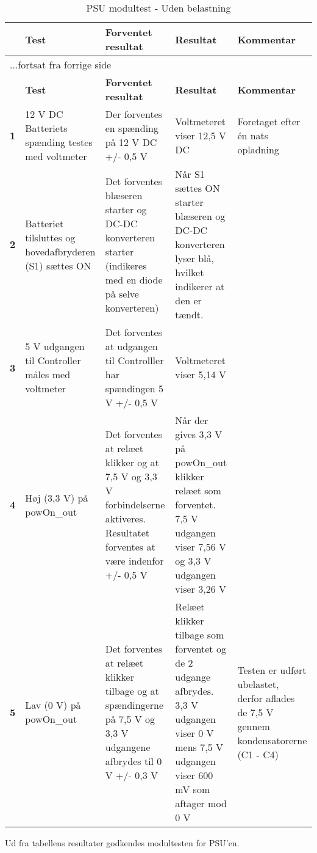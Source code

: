 \begin{center}
\label{modultest_psu} 
\begin{longtable}{|p{}|p{3cm}|p{3cm}|p{3cm}|p{3cm}|} %
\caption{PSU modultest - Uden belastning}\\
\hline
\multicolumn{1}{|c|}{} &
\textbf{Test} &
\textbf{Forventet \newline resultat} &
\textbf{Resultat} &
\textbf{Kommentar} \\ \hline 
\endfirsthead

\multicolumn{5}{l}{...fortsat fra forrige side} \\ \hline 
\multicolumn{1}{|c|}{} &
\textbf{Test} &
\textbf{Forventet \newline resultat} &
\textbf{Resultat} &
\textbf{Kommentar} \\ \hline 
\endhead

\textbf{1}	&12 V DC Batteriets spænding testes med voltmeter
			&Der forventes en spænding på 12 V DC +/- 0,5 V
			&Voltmeteret viser 12,5 V DC
			&Foretaget efter én nats opladning  
			\\ \hline 
			
\textbf{2}	&Batteriet tilsluttes og hovedafbryderen (S1) sættes ON
			&Det forventes blæseren starter og DC-DC konverteren starter (indikeres med en diode på selve konverteren)
			&Når S1 sættes ON starter blæseren og DC-DC konverteren lyser blå, hvilket indikerer at den er tændt.
			&  \\ \hline 
			
\textbf{3}	&5 V udgangen til Controller måles med voltmeter
			&Det forventes at udgangen til Controlller har spændingen 5 V +/- 0,5 V
			&Voltmeteret viser 5,14 V
			&  \\ \hline 
			
\textbf{4}	&Høj (3,3 V) på powOn\_out 
			&Det forventes at relæet klikker og at 7,5 V og 3,3 V forbindelserne aktiveres. Resultatet forventes at være indenfor +/- 0,5 V
			&Når der gives 3,3 V på powOn\_out klikker relæet som forventet. 7,5 V udgangen viser 7,56 V og 3,3 V udgangen viser 3,26 V
			&  \\ \hline  
			
\textbf{5}	&Lav (0 V) på powOn\_out 
			&Det forventes at relæet klikker tilbage og at spændingerne på 7,5 V og 3,3 V udgangene afbrydes til 0 V +/- 0,3 V
			&Relæet klikker tilbage som forventet og de 2 udgange afbrydes. 3,3 V udgangen viser 0 V mens 7,5 V udgangen viser 600 mV som aftager mod 0 V
			&Testen er udført ubelastet, derfor aflades de 7,5 V gennem kondensatorerne (C1 - C4)  \\ \hline 					
					
\end{longtable}
\end{center}

Ud fra tabellens resultater godkendes modultesten for PSU'en. 